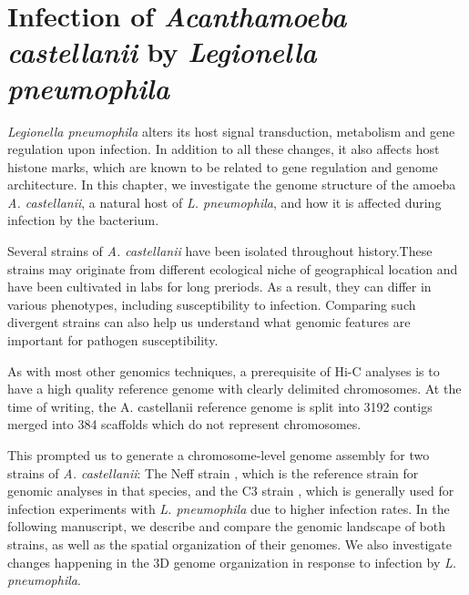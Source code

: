 
\chapter{Infection of \textit{Acanthamoeba castellanii} by \textit{Legionella pneumophila}} %

\label{ch:02-02} %


\textit{Legionella pneumophila} alters its host signal transduction, metabolism and gene regulation upon infection. In addition to all these changes, it also affects host histone marks, which are known to be related to gene regulation and genome architecture. In this chapter, we investigate the genome structure of the amoeba \textit{A. castellanii}, a natural host of \textit{L. pneumophila}, and how it is affected during infection by the bacterium.

Several strains of \textit{A. castellanii} have been isolated throughout history.These strains may originate from different ecological niche of geographical location and have been cultivated in labs for long preriods. As a result, they can differ in various phenotypes, including susceptibility to infection. Comparing such divergent strains can also help us understand what genomic features are important for pathogen susceptibility.

As with most other genomics techniques, a prerequisite of Hi-C analyses is to have a high quality reference genome with clearly delimited chromosomes. At the time of writing, the A. castellanii reference genome is split into 3192 contigs merged into 384 scaffolds which do not represent chromosomes.

This prompted us to generate a chromosome-level genome assembly for two strains of \textit{A. castellanii}: The Neff strain \cite{neffPurificationAxenicCultivation1957}, which is the reference strain for genomic analyses in that species, and the C3 strain \cite{michelIsolationAcanthamoebaStrain1997}, which is generally used for infection experiments with \textit{L. pneumophila} due to higher infection rates. In the following manuscript, we describe and compare the genomic landscape of both strains, as well as the spatial organization of their genomes. We also investigate changes happening in the 3D genome organization in response to infection by \textit{L. pneumophila}.

